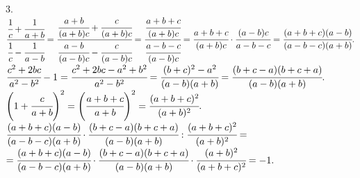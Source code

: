 3. $\cfrac{\cfrac{1}{c}+\cfrac{1}{a+b}}{\cfrac{1}{c}-\cfrac{1}{a-b}}=
\cfrac{\cfrac{a+b}{(a+b)c}+\cfrac{c}{(a+b)c}}{\cfrac{a-b}{(a-b)c}-\cfrac{c}{(a-b)c}}=
\cfrac{\cfrac{a+b+c}{(a+b)c}}{\cfrac{a-b-c}{(a-b)c}}=\cfrac{a+b+c}{(a+b)c}\cdot\cfrac{(a-b)c}{a-b-c}=\cfrac{(a+b+c)(a-b)}{(a-b-c)(a+b)}.$\\
$\cfrac{c^2+2bc}{a^2-b^2}-1=\cfrac{c^2+2bc-a^2+b^2}{a^2-b^2}=\cfrac{(b+c)^2-a^2}{(a-b)(a+b)}=\cfrac{(b+c-a)(b+c+a)}{(a-b)(a+b)}.$\\
$\left(1+\cfrac{c}{a+b}\right)^2=\left(\cfrac{a+b+c}{a+b}\right)^2=\cfrac{(a+b+c)^2}{(a+b)^2}.$\\
$\cfrac{(a+b+c)(a-b)}{(a-b-c)(a+b)}\cdot\cfrac{(b+c-a)(b+c+a)}{(a-b)(a+b)}:\cfrac{(a+b+c)^2}{(a+b)^2}=$\\$=
\cfrac{(a+b+c)(a-b)}{(a-b-c)(a+b)}\cdot\cfrac{(b+c-a)(b+c+a)}{(a-b)(a+b)}\cdot\cfrac{(a+b)^2}{(a+b+c)^2}=-1.$\\
